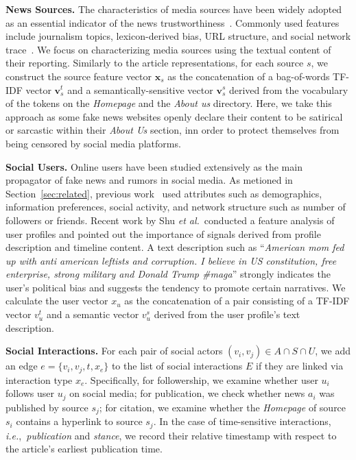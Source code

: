 \documentclass[sigconf,anonymous]{acmart}
\theoremstyle{definition}
\theoremstyle{hypothesis}
\begin{document}
\textbf{News Sources.} The characteristics of media sources have been widely adopted as an essential indicator of the news trustworthiness~\cite{baly2018predicting,kulkarni2018multi}. Commonly used features include journalism topics, lexicon-derived bias, URL structure, and social network trace~\cite{baly2018predicting}. We focus on characterizing media sources using the textual content of their reporting. Similarly to the article representations, for each source $s$, we construct the source feature vector $\boldsymbol{x}_s$ as the concatenation of a bag-of-words TF-IDF vector $\boldsymbol{v}^t_s$ and a semantically-sensitive vector $\boldsymbol{v}^s_s$ derived from 
the vocabulary of the tokens on the \emph{Homepage} and the \emph{About us} directory.  Here, we take this approach as some fake news websites openly declare their content to be satirical or sarcastic within their \emph{About Us} section, inn order to protect themselves from being censored by social media platforms. 

\textbf{Social Users.} Online users have been studied extensively as the main propagator of fake news and rumors in social media. As metioned in Section~\ref{sec:related}, previous work~\cite{castillo2011information,yang2012automatic} used attributes such as demographics, information preferences, social activity, and network structure such as number of followers or 
friends. 
Recent work by Shu {\it et al.}~conducted a feature analysis of user profiles and pointed out the importance of signals derived from profile description and timeline content. A text description such as ``\emph{American mom fed up with anti american leftists and corruption. I believe in US constitution, free enterprise, strong military and Donald Trump \#maga}'' strongly indicates the user's political bias and suggests the tendency to promote certain narratives. We calculate the user vector $x_u$ as the concatenation of a pair consisting of a TF-IDF vector $v^t_u$ and a semantic vector $v^s_u$ derived from the user profile's text description. 

\textbf{Social Interactions.} For each pair of social actors $(v_i, v_j)\in A\cap S\cap U$, we add an edge $e=\{v_i, v_j, t, x_e\}$ to the list of social interactions $E$ if they are linked via interaction type $x_e$. Specifically, for followership, we examine whether user $u_i$ follows user $u_j$ on social media; for publication, we check whether news $a_i$ was published by source $s_j$; for citation, we examine whether the \emph{Homepage} of source $s_i$ contains a hyperlink to source $s_j$. In the case of time-sensitive interactions, \textit{i.e.},~\textit{publication} and \textit{stance}, we record their relative timestamp with respect to the article's earliest publication time.
\end{document}
